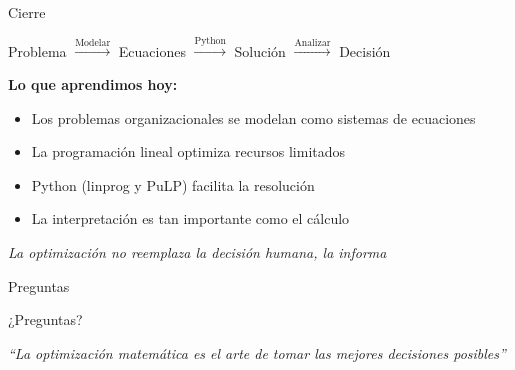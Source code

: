 \documentclass[aspectratio=169,10pt]{beamer}
\begin{document}
\begin{frame}{Cierre}

\vspace{0.8cm}

\begin{center}
\LARGE
Problema $\xrightarrow{\text{Modelar}}$ Ecuaciones $\xrightarrow{\text{Python}}$ Solución $\xrightarrow{\text{Analizar}}$ Decisión
\end{center}

\vspace{0.8cm}

\textbf{Lo que aprendimos hoy:}
\begin{itemize}
    \item Los problemas organizacionales se modelan como sistemas de ecuaciones
    \item La programación lineal optimiza recursos limitados
    \item Python (linprog y PuLP) facilita la resolución
    \item La interpretación es tan importante como el cálculo
\end{itemize}

\vspace{0.5cm}

\begin{center}
\textit{La optimización no reemplaza la decisión humana, la informa}
\end{center}

\end{frame}

\begin{frame}{Preguntas}

\vspace{2cm}

\begin{center}
\Huge
¿Preguntas?
\end{center}

\vspace{1cm}

\begin{center}
\large
\textit{``La optimización matemática es el arte de tomar las mejores decisiones posibles''}
\end{center}

\end{frame}
\end{document}
